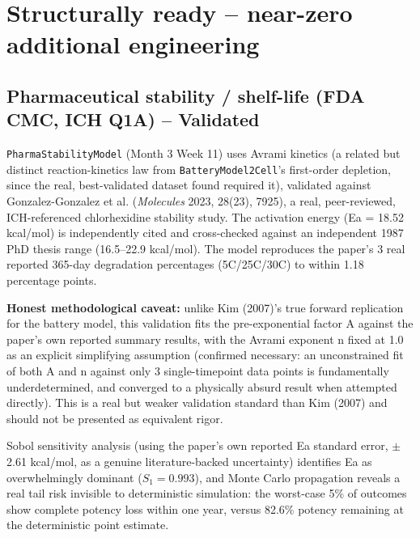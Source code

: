 \documentclass[11pt]{article}
\begin{document}
\section*{Structurally ready -- near-zero additional engineering}

\subsection*{Pharmaceutical stability / shelf-life (FDA CMC, ICH Q1A) -- Validated}
\texttt{PharmaStabilityModel} (Month 3 Week 11) uses Avrami kinetics
(a related but distinct reaction-kinetics law from
\texttt{BatteryModel2Cell}'s first-order depletion, since the
real, best-validated dataset found required it), validated against
Gonzalez-Gonzalez et al. (\emph{Molecules} 2023, 28(23), 7925), a
real, peer-reviewed, ICH-referenced chlorhexidine stability study.
The activation energy (Ea = 18.52 kcal/mol) is independently cited
and cross-checked against an independent 1987 PhD thesis range
(16.5--22.9 kcal/mol). The model reproduces the paper's 3 real
reported 365-day degradation percentages (5C/25C/30C) to within
1.18 percentage points.

\textbf{Honest methodological caveat:} unlike Kim (2007)'s true
forward replication for the battery model, this validation fits
the pre-exponential factor A against the paper's own reported
summary results, with the Avrami exponent n fixed at 1.0 as an
explicit simplifying assumption (confirmed necessary: an
unconstrained fit of both A and n against only 3 single-timepoint
data points is fundamentally underdetermined, and converged to a
physically absurd result when attempted directly). This is a real
but weaker validation standard than Kim (2007) and should not be
presented as equivalent rigor.

Sobol sensitivity analysis (using the paper's own reported Ea
standard error, $\pm$2.61 kcal/mol, as a genuine literature-backed
uncertainty) identifies Ea as overwhelmingly dominant
($S_1 = 0.993$), and Monte Carlo propagation reveals a real tail
risk invisible to deterministic simulation: the worst-case 5\% of
outcomes show complete potency loss within one year, versus 82.6\%
potency remaining at the deterministic point estimate.
\end{document}
